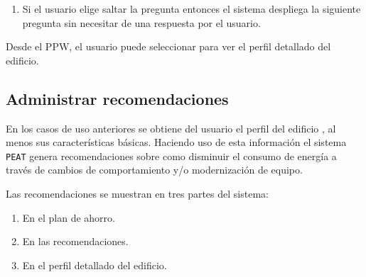 \begin{usecase}
{\begin{enumerate}
\begin{enumerate}
\begin{enumerate}[i.]
          son recalculadas.
        \item El sistema despliega un indicador de progreso mientras
          se recalculan las recomendaciones.
        \item Al finalizar el refinamiento el orden de las preguntas
          o los valores del plan de ahorro deberán ser actualizados, sin recargar
          la página completa.
        \end{enumerate}
      \item El sistema despliega la siguiente pregunta.
      \item El sistema almacena la respuesta dada.
      \end{enumerate}
    \item Si el usuario elige saltar la pregunta entonces el sistema
      despliega la siguiente pregunta sin necesitar de una respuesta por el usuario.
    \end{enumerate}
  \item Desde el PPW, el usuario puede seleccionar  para
    ver el perfil detallado del edificio.
  }
\end{usecase}

\subsection{Administrar recomendaciones}

En los casos de uso anteriores se obtiene del usuario el perfil del edificio
, al menos sus características básicas. Haciendo uso de esta información
el sistema \texttt{PEAT} genera recomendaciones sobre como disminuir el consumo
de energía a través de cambios de comportamiento y/o modernización de equipo.

Las recomendaciones se muestran en tres partes del sistema:
\begin{enumerate}
\item En el plan de ahorro.
\item En las recomendaciones.
\item En el perfil detallado del edificio.
\end{enumerate}


